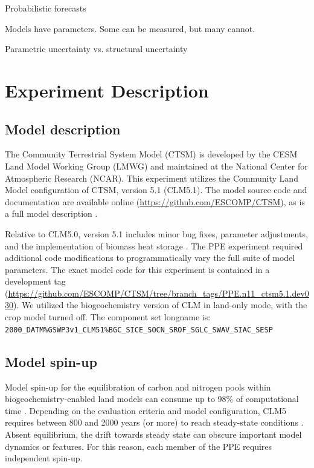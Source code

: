 \documentclass[draft]{agujournal2019}
\begin{document}
Probabilistic forecasts

Models have parameters.
Some can be measured, but many cannot.


Parametric uncertainty vs. structural uncertainty



\section{Experiment Description}
\label{methods}
\subsection{Model description}
\label{sect:md}
The Community Terrestrial System Model (CTSM) is developed by the CESM Land Model Working Group (LMWG) and maintained at the National Center for Atmospheric Research (NCAR). This experiment utilizes the Community Land Model configuration of CTSM, version 5.1 (CLM5.1). The model source code and documentation are available online (\url{https://github.com/ESCOMP/CTSM}), as is a full model description \cite{lawrence2019}.

Relative to CLM5.0, version 5.1 includes minor bug fixes, parameter adjustments, and the implementation of biomass heat storage \cite{swenson2019}. The PPE experiment required additional code modifications to programmatically vary the full suite of model parameters. The exact model code for this experiment is contained in a development tag (\url{https://github.com/ESCOMP/CTSM/tree/branch_tags/PPE.n11_ctsm5.1.dev030}). We utilized the biogeochemistry version of CLM in land-only mode, with the crop model turned off. The component set longname is: \\ \texttt{2000\_DATM\%GSWP3v1\_CLM51\%BGC\_SICE\_SOCN\_SROF\_SGLC\_SWAV\_SIAC\_SESP}

\subsection{Model spin-up}
Model spin-up for the equilibration of carbon and nitrogen pools within biogeochemistry-enabled land models can consume up to 98\% of computational time \cite{sun2023}. Depending on the evaluation criteria and model configuration, CLM5 requires between 800 and 2000 years (or more) to reach steady-state conditions \cite{lawrence2019}. Absent equilibrium, the drift towards steady state can obscure important model dynamics or features. For this reason, each member of the PPE requires independent spin-up.
\end{document}
